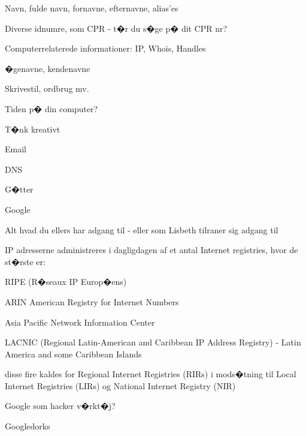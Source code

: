 \documentclass[20pt,landscape,a4paper,footrule]{foils}
\begin{document}
\begin{list1}
\item Navn, fulde navn, fornavne, efternavne, alias'es
\item Diverse idnumre, som CPR - t�r du s�ge p� dit CPR nr?
\item Computerrelaterede informationer: IP, Whois, Handles
\item �genavne, kendenavne
\item Skrivestil, ordbrug mv.
\item Tiden p� din computer?
\item T�nk kreativt \smiley
\end{list1}



\begin{list1}
\item Email
\item DNS
\item G�tter
\item Google
\item Alt hvad du ellers har adgang til - eller som Lisbeth tilraner sig adgang til
\end{list1}


\begin{list1}
\item IP adresserne administreres i dagligdagen af et antal Internet
  registries, hvor de st�rste er:
\begin{list2}
\item RIPE (R�seaux IP Europ�ens)  
\item ARIN American Registry for Internet Numbers 
\item Asia Pacific Network Information Center 
\item LACNIC (Regional Latin-American and Caribbean IP Address Registry) - Latin America and some Caribbean Islands
\end{list2}
\item disse fire kaldes for Regional Internet Registries (RIRs) i
  mods�tning til Local Internet Registries (LIRs) og National Internet
  Registry (NIR)
\end{list1}



\begin{list1}
\item Google som hacker v�rkt�j?
\item Googledorks
\end{list1}
\end{document}
